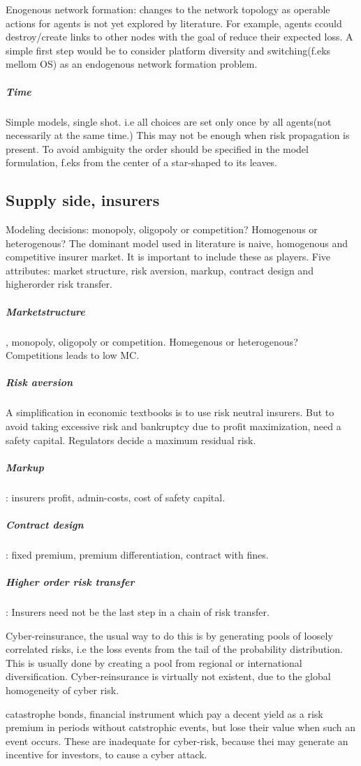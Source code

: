 Enogenous network formation: changes to the network topology as operable actions for agents is not yet explored by literature.
For example, agents ccould destroy/create links to other nodes with the goal of reduce their expected loss. 
A simple first step would be to consider platform diversity and switching(f.eks mellom OS) as an endogenous network formation problem. 

\subparagraph{Time}
Simple models, single shot. i.e all choices are set only once by all agents(not necessarily at the same time.)
This may not be enough when risk propagation is present. To avoid ambiguity the order should be specified in the model formulation, f.eks from the center of a star-shaped to its leaves.
\subsection{Supply side, insurers}
Modeling decisions: monopoly, oligopoly or competition? Homogenous or heterogenous?
The dominant model used in literature is naive, homogenous and competitive insurer market. 
It is important to include these as players. 
Five attributes: market structure, risk aversion, markup, contract design and higherorder risk transfer.
\subparagraph{ Marketstructure}, monopoly, oligopoly or competition. Homegenous or heterogenous? 
Competitions leads to low MC. 
\subparagraph{ Risk aversion} A simplification in economic textbooks is to use risk neutral insurers.
But to avoid taking excessive risk and bankruptcy due to profit maximization, need a safety capital. Regulators decide a maximum residual risk. 
\subparagraph{Markup}: insurers profit, admin-costs, cost of safety capital. 
\subparagraph{Contract design}: fixed premium, premium differentiation, contract with fines.
\subparagraph{Higher order risk transfer}:
Insurers need not be the last step in a chain of risk transfer. 

Cyber-reinsurance, the usual way to do this is by generating pools of loosely correlated risks, i.e the loss events from the tail of the probability distribution. This is usually done by creating a pool from regional or international diversification. Cyber-reinsurance is virtually not existent, due to the global homogeneity of cyber risk. 

catastrophe bonds, financial instrument which pay a decent yield as a risk premium in periods without 
catstrophic events, but lose their value when such an event occurs. 
These are inadequate for cyber-risk, because thei may generate an incentive for investors, 
to cause a cyber attack.


